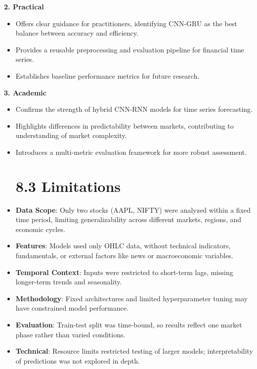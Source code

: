 \documentclass[12pt,a4paper]{report}
\begin{document}
\textbf{2. Practical}

\begin{itemize}
  \item Offers clear guidance for practitioners, identifying CNN-GRU as the best balance between accuracy and efficiency.
  \item Provides a reusable preprocessing and evaluation pipeline for financial time series.
  \item Establishes baseline performance metrics for future research.
\end{itemize}

\textbf{3. Academic}

\begin{itemize}
  \item Confirms the strength of hybrid CNN-RNN models for time series forecasting.
  \item Highlights differences in predictability between markets, contributing to understanding of market complexity.
  \item Introduces a multi-metric evaluation framework for more robust assessment.
\section{8.3 Limitations}
  \item \textbf{Data Scope}: Only two stocks (AAPL, NIFTY) were analyzed within a fixed time period, limiting generalizability across different markets, regions, and economic cycles.
  \item \textbf{Features}: Models used only OHLC data, without technical indicators, fundamentals, or external factors like news or macroeconomic variables.
  \item \textbf{Temporal Context}: Inputs were restricted to short-term lags, missing longer-term trends and seasonality.
  \item \textbf{Methodology}: Fixed architectures and limited hyperparameter tuning may have constrained model performance.
  \item \textbf{Evaluation}: Train-test split was time-bound, so results reflect one market phase rather than varied conditions.
  \item \textbf{Technical}: Resource limits restricted testing of larger models; interpretability of predictions was not explored in depth.

\end{itemize}
\end{document}

